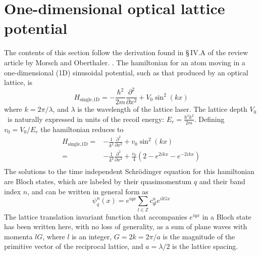 \documentclass[oneside,11pt]{memoir}
\newcommand{\vo}{\ensuremath{V_{0}}}
\newcommand{\vvo}{\ensuremath{v_{0}}}
\newcommand{\er}{\ensuremath{E_{r}}}
\begin{document}
\section{One-dimensional optical lattice potential}

The contents of this section follow the derivation found in \S\,IV.A of the
review article by Morsch and Oberthaler.  \cite{RevModPhys.78.179}.  The
hamiltonian for an atom moving in a one-dimensional (1D) sinusoidal potential,
such as that produced by an optical lattice, is 
\begin{equation}
  H_{\text{single,1D}} = 
  - \frac{\hbar^{2}}{2m} \frac{\partial^{2}}{\partial x^{2}} 
  + \vo\sin^{2}(kx) 
 \label{eq:Hsingle1D}
\end{equation}
where $k=2\pi/\lambda$, and $\lambda$ is the wavelength of the lattice laser.
The lattice depth \vo\ is naturally expressed in units of the recoil energy:
$\er=\frac{\hbar^{2}k^{2}}{2m}$.  Defining $\vvo=\vo/\er$ the hamiltonian
reduces to  
\begin{equation}
\begin{split}
  H_{\text{single,1D}}= &
    -\frac{1}{k^{2}} \frac{\partial^{2}}{\partial x^{2}} 
    + \vvo\sin^{2}(kx) \\
           = &
    -\frac{1}{k^{2}} \frac{\partial^{2}}{\partial x^{2}} 
    + \frac{\vvo}{4}(2 - e^{2ikx} - e^{-2ikx} )  \\
\end{split}
\end{equation}
The solutions to the time independent Schr\"{o}dinger equation for this
hamiltonian are Bloch states, which are labeled by their quasimomentum $q$ and
their band index $n$, and can be written in general form as 
\begin{equation}
  \psi_{q}^{n}(x) = e^{iqx} \sum_{l \in \mathbb{Z}} c_{ql}^{n} e^{ilGx}
  \label{eq:blochstate}
\end{equation}
The lattice translation invariant function that accompanies $e^{iqx}$ in a
Bloch state has been written here, with no loss of generality, as a sum of
plane waves with momenta $lG$,  where $l$ is an integer, $G=2k=2\pi/a$  is the
magnitude of the primitive vector of the reciprocal lattice,  and $a=\lambda/2$
is the lattice spacing. 
\end{document}
